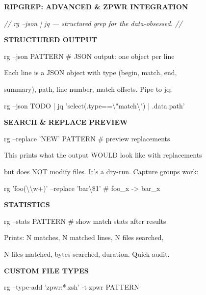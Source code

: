 \documentclass[11pt,a4paper,twoside]{book}
\begin{document}
\vspace{10pt}
{\large\bfseries\color{neoncyan} RIPGREP: ADVANCED \& ZPWR INTEGRATION}\vspace{6pt}

{\small\itshape\color{dimtext} // rg --json | jq — structured grep for the data-obsessed. //}


\vspace{12pt}
{\bfseries\color{neonyellow} STRUCTURED OUTPUT}\vspace{4pt}

rg --json PATTERN   \# JSON output: one object per line

Each line is a JSON object with type (begin, match, end,

summary), path, line number, match offsets. Pipe to jq:

\begin{codebox}
rg --json TODO | jq 'select(.type==\textbackslash{}"match\textbackslash{}") | .data.path'\\
\end{codebox}


\vspace{12pt}
{\bfseries\color{neonyellow} SEARCH \& REPLACE PREVIEW}\vspace{4pt}

rg --replace 'NEW' PATTERN  \# preview replacements

This prints what the output WOULD look like with replacements

but does NOT modify files. It's a dry-run. Capture groups work:

\begin{codebox}
rg 'foo(\textbackslash{}\textbackslash{}w+)' --replace 'bar\textbackslash{}\$1'  \# foo\_x -> bar\_x\\
\end{codebox}


\vspace{12pt}
{\bfseries\color{neonyellow} STATISTICS}\vspace{4pt}

rg --stats PATTERN   \# show match stats after results

Prints: N matches, N matched lines, N files searched,

N files matched, bytes searched, duration. Quick audit.


\vspace{12pt}
{\bfseries\color{neonyellow} CUSTOM FILE TYPES}\vspace{4pt}

\begin{codebox}
rg --type-add 'zpwr:*.zsh' -t zpwr PATTERN\\
\end{codebox}
\end{document}
